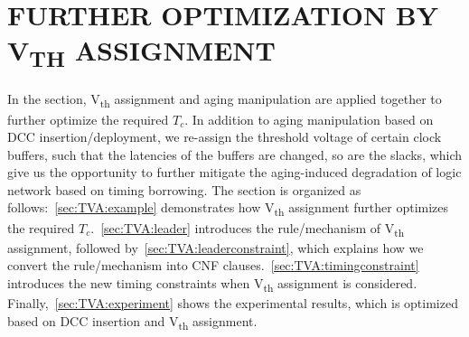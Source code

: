 \section{FURTHER OPTIMIZATION BY V\textsubscript{TH} ASSIGNMENT}
\label{sec:TVA}
In the section, V\textsubscript{th} assignment and aging manipulation are applied together to further optimize the required $T_c$. In addition to aging manipulation based on DCC insertion/deployment, we re-assign the threshold voltage of certain clock buffers, such that the latencies of the buffers are changed, so are the slacks, which give us the opportunity to further mitigate the aging-induced degradation of logic network based on timing borrowing. The section is organized as follows:~\ref{sec:TVA:example} demonstrates how V\textsubscript{th} assignment further optimizes the required $T_c$.~\ref{sec:TVA:leader} introduces the rule/mechanism of V\textsubscript{th} assignment, followed by~\ref{sec:TVA:leaderconstraint}, which explains how we convert the rule/mechanism into CNF clauses.~\ref{sec:TVA:timingconstraint} introduces the new timing constraints when V\textsubscript{th} assignment is considered. Finally,~\ref{sec:TVA:experiment} shows the experimental results, which is optimized based on DCC insertion and V\textsubscript{th} assignment.

